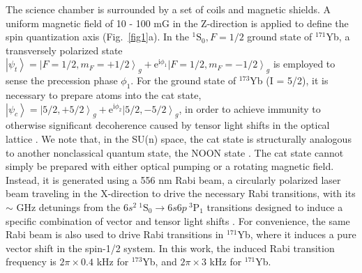 \documentclass[pdflatex,sn-nature,centre]{sn-jnl}%
\begin{document}
The science chamber is surrounded by a set of coils and magnetic shields. A uniform magnetic field of 10 - 100 mG in the Z-direction is applied to define the spin quantization axis (Fig.~\ref{fig1}a). In the $^{1}\mathrm S_0,\mathit F=\mathrm 1/2$ ground state of $^{171}$Yb, a transversely polarized state $\left\vert\psi_{t}\right\rangle = \left\vert F=1/2,m_F=+1/2\right\rangle_g+\mathrm{e}^{\mathrm{i}\phi_1}\left\vert\mathit F=\mathrm 1/2,\mathit m_F=\mathrm-1/2\right\rangle_{\mathit g}$ is employed to sense the precession phase $\phi_{1}$. For the ground state of $^{173}$Yb  (I = 5/2), it is necessary to prepare atoms into the cat state, $\left\vert\psi_{c}\right\rangle = \left\vert5/2,+5/2\right\rangle_g+\mathrm{e}^{\mathrm{i}\phi_2}\left\vert5/2,-5/2\right\rangle_g$, in order to achieve immunity to otherwise significant decoherence caused by tensor light shifts in the optical lattice \cite{Yang2024Cat}. We note that, in the SU(n) space, the cat state is structurally analogous to another nonclassical quantum state, the NOON state \cite{Wolfgramm2010NOON}. The cat state cannot simply be prepared with either optical pumping or a rotating magnetic field. Instead, it is generated using a 556 nm Rabi beam, a circularly polarized laser beam traveling in the X-direction to drive the necessary Rabi transitions, with its $\sim$ GHz detunings from the ${6s^2}\ {^{1}\mathrm{S}_0}\rightarrow{6s6p\ ^{3}\mathrm{P}_1}$ transitions designed to induce a specific combination of vector and tensor light shifts \cite{Yang2024Cat}. For convenience, the same Rabi beam is also used to drive Rabi transitions in $^{171}$Yb, where it induces a pure vector shift in the spin-1/2 system. In this work, the induced Rabi transition frequency is $2\pi\times0.4$ kHz for $^{173}$Yb, and $2\pi\times3$ kHz for $^{171}$Yb.
\end{document}
